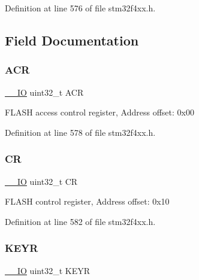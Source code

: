 Definition at line 576 of file stm32f4xx.\+h.



\subsection{Field Documentation}
\mbox{\label{struct_f_l_a_s_h___type_def_a9cb55206b29a8c16354747c556ab8bea}} 
\subsubsection{\texorpdfstring{A\+CR}{ACR}}
{\footnotesize\ttfamily \hyperlink{group___c_m_s_i_s__core__definitions_gaec43007d9998a0a0e01faede4133d6be}{\+\_\+\+\_\+\+IO} uint32\+\_\+t A\+CR}

F\+L\+A\+SH access control register, Address offset\+: 0x00 

Definition at line 578 of file stm32f4xx.\+h.

\mbox{\label{struct_f_l_a_s_h___type_def_ab40c89c59391aaa9d9a8ec011dd0907a}} 
\subsubsection{\texorpdfstring{CR}{CR}}
{\footnotesize\ttfamily \hyperlink{group___c_m_s_i_s__core__definitions_gaec43007d9998a0a0e01faede4133d6be}{\+\_\+\+\_\+\+IO} uint32\+\_\+t CR}

F\+L\+A\+SH control register, Address offset\+: 0x10 

Definition at line 582 of file stm32f4xx.\+h.

\mbox{\label{struct_f_l_a_s_h___type_def_a84c491be6c66b1d5b6a2efd0740b3d0c}} 
\subsubsection{\texorpdfstring{K\+E\+YR}{KEYR}}
{\footnotesize\ttfamily \hyperlink{group___c_m_s_i_s__core__definitions_gaec43007d9998a0a0e01faede4133d6be}{\+\_\+\+\_\+\+IO} uint32\+\_\+t K\+E\+YR}


